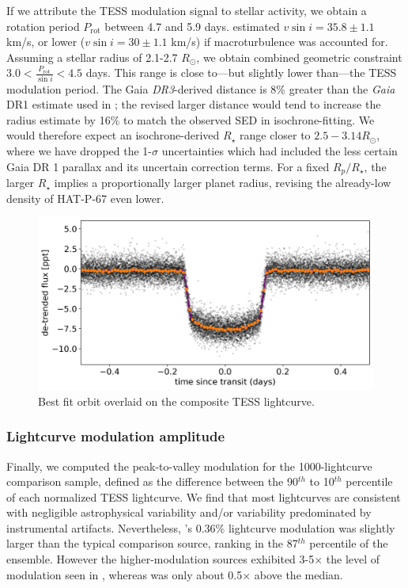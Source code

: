 \documentclass[twocolumn]{aastex631}
\begin{document}
If we attribute the TESS modulation signal to stellar activity, we obtain a rotation period $P_\mathrm{rot}$ between 4.7 and 5.9 days.  \citet{2017AJ....153..211Z} estimated $v\sin{i}=35.8\pm1.1$ km/s, or lower ($v\sin{i}=30\pm1.1$ km/s) if macroturbulence was accounted for.  Assuming a stellar radius of 2.1-2.7 $R_\odot$, we obtain combined geometric constraint $3.0 < \frac{P_\mathrm{rot}}{\sin{i}}  < 4.5 $ days.  This range is close to---but slightly lower than---the TESS modulation period.   The Gaia \emph{DR3}-derived distance is 8\% greater than the \emph{Gaia} DR1 estimate used in \citet{2017AJ....153..211Z}; the revised larger distance would tend to increase the radius estimate by 16\% to match the observed SED in isochrone-fitting.  We would therefore expect an isochrone-derived $R_\star$ range closer to $2.5-3.14 R_\odot$, where we have dropped the 1-$\sigma$ uncertainties which had included the less certain Gaia DR 1 parallax and its uncertain correction terms.  For a fixed $R_p/R_\star$, the larger $R_\star$ implies a proportionally larger planet radius, revising the already-low density of HAT-P-67 even lower.

\begin{figure}
    \includegraphics[width=\linewidth]{figures/best_fit_orbit.png}
    \caption{Best fit orbit overlaid on the composite TESS lightcurve.}
    \label{fig:transit}
\end{figure}

\subsubsection{Lightcurve modulation amplitude}
Finally, we computed the peak-to-valley modulation for the 1000-lightcurve comparison sample, defined as the difference between the 90$^{th}$ to 10$^{th}$ percentile of each normalized TESS lightcurve.   We find that most lightcurves are consistent with negligible astrophysical variability and/or variability predominated by instrumental artifacts. Nevertheless, 's 0.36$\%$ lightcurve modulation was slightly larger than the typical comparison source, ranking in the 87$^{th}$ percentile of the ensemble.  However the higher-modulation sources exhibited 3-5$\times$ the level of modulation seen in , whereas  was only about 0.5$\times$ above the median.
\end{document}
